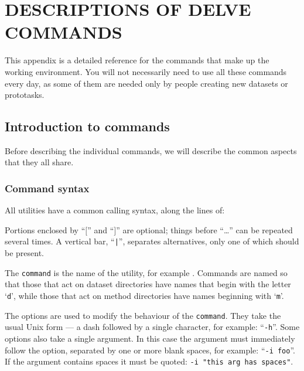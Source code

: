 %
%

\newpage
\section{DESCRIPTIONS OF DELVE COMMANDS}\label{app-commands}
\thispagestyle{plain}
\setcounter{figure}{0}

This appendix is a detailed reference for the commands that make up
the \delve{} working environment.  You will not necessarily need to
use all these commands every day, as some of them are needed only by
people creating new datasets or prototasks.

\subsection*{Introduction to \delve{} commands}
Before describing the individual \delve{} commands, we will describe
the common aspects that they all share. 

\subsubsection*{Command syntax}
All \delve{} utilities have a common calling syntax, along the lines of:


Portions enclosed by ``$[$'' and ``$]$'' are optional; things before
``\ldots'' can be repeated several times.  A vertical bar, ``\texttt{|}'',
separates alternatives, only one of which should be present.

The \texttt{command} is the name of the \delve{} utility, for example
\dinfo{}.  Commands are named so that those that act on dataset
directories have names that begin with the letter `\texttt{d}', while
those that act on method directories have names beginning with
`\texttt{m}'.

The options are used to modify the behaviour of the \texttt{command}.
They take the usual Unix form --- a dash followed by a single
character, for example: ``\texttt{-h}''.  Some options also take a
single argument.  In this case the argument must immediately follow
the option, separated by one or more blank spaces, for example:
\mbox{``\texttt{-i foo}''}.  If the argument contains spaces it must be
quoted: \mbox{\texttt{-i "this arg has spaces"}}.

